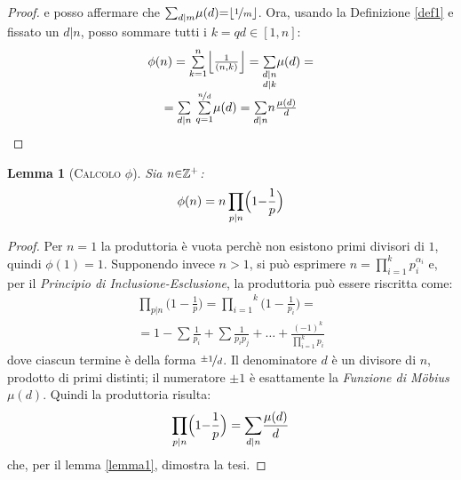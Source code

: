 \documentclass[twoside,symmetric,justified,openany,nobib]{tufte-book}
\newtheorem{lem}{Lemma}
\begin{document}
{\begin{proof}
    e posso affermare che ${\sum_{d|m}}\mu(d) {=} \lfloor \nicefrac{1}{m}\rfloor$.
    Ora, usando la Definizione \ref{def1} e fissato un $d|n$, posso sommare tutti i $k{=}qd{\in}[1,n]$:
    \[
      \begin{array}{c}
        \phi(n) = \overset{n}{\underset{k=1}{\sum}}\Bigl\lfloor\frac{1}{(n,k)}\Bigr\rfloor = \underset{ \begin{subarray}{c}
                                                                                                              d|n\\
                                                                                                              d|k
                                                                                                            \end{subarray}}{\sum}\mu(d) =\\
        \hspace{20pt}= \underset{d|n}{\sum}\ \overset{\nicefrac{n}{d}}{\underset{q=1}{\sum}}\mu(d) = \underset{d|n}{\sum}n\frac{\mu(d)}{d}\hspace{20pt}\hfill\qedhere
      \end{array}
    \]
  \end{proof}

  \begin{lem}[\textsc{Calcolo} $\phi$]
    \label{lemma2}
    Sia $n{\in}\mathbb{Z}\textsuperscript{+}$:
    \begin{equation}
      \phi(n)=n\, {\underset{p|n}{\prod}}\Bigl(1{-}\frac{1}{p}\Bigr)
    \end{equation}
  \end{lem}

  \begin{proof}
    Per $n{=}1$ la produttoria è vuota perchè non esistono primi divisori di $1$, quindi $\phi(1){=}1$.
    Supponendo invece $n{>}1$, si può esprimere $n{=}{\prod^{k}_{i=1}}p^{\alpha_i}_{i}$
    e, per il \textit{Principio di Inclusione-Esclusione}, la produttoria può essere riscritta come:
    \[
      \begin{array}{c}
        \underset{p|n}{\prod}\bigl(1{-}\frac{1}{p}\bigr) = \overset{k}{\underset{i=1}{\prod}}\bigl(1{-}\frac{1}{p_i}\bigr) =\\
        = 1 {-} {\sum}\frac{1}{p_i} {+} {\sum}\frac{1}{p_i p_j} {+} \dots {+} \frac{({-}1)^k}{{\prod^{k}_{i=1}}p_{i}}
      \end{array}
    \]
    dove ciascun termine è della forma $\nicefrac{\pm1}{d}$. Il denominatore $d$ è un divisore di $n$, prodotto di primi distinti; il numeratore $\pm1$ è esattamente la \textit{Funzione di M\"obius} $\mu(d)$. Quindi la produttoria risulta:
    \[
      \underset{p|n}{\prod}\Bigl(1{-}\frac{1}{p}\Bigr) = \underset{d|n}{\sum}\frac{\mu(d)}{d}
    \]
    che, per il lemma \ref{lemma1}, dimostra la tesi.
  \end{proof}
}
\end{document}
